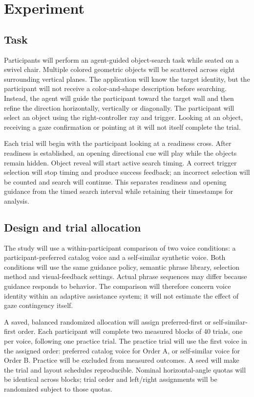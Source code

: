 \documentclass[11pt,letterpaper]{article}
\begin{document}
\setcounter{section}{3}
\section{Experiment}
\subsection{Task}
Participants will perform an agent-guided object-search task while seated on a swivel chair. Multiple colored geometric objects will be scattered across eight surrounding vertical planes. The application will know the target identity, but the participant will not receive a color-and-shape description before searching. Instead, the agent will guide the participant toward the target wall and then refine the direction horizontally, vertically or diagonally. The participant will select an object using the right-controller ray and trigger. Looking at an object, receiving a gaze confirmation or pointing at it will not itself complete the trial.

Each trial will begin with the participant looking at a readiness cross. After readiness is established, an opening directional cue will play while the objects remain hidden. Object reveal will start active search timing. A correct trigger selection will stop timing and produce success feedback; an incorrect selection will be counted and search will continue. This separates readiness and opening guidance from the timed search interval while retaining their timestamps for analysis.

\subsection{Design and trial allocation}
The study will use a within-participant comparison of two voice conditions: a participant-preferred catalog voice and a self-similar synthetic voice. Both conditions will use the same guidance policy, semantic phrase library, selection method and visual-feedback settings. Actual phrase sequences may differ because guidance responds to behavior. The comparison will therefore concern voice identity within an adaptive assistance system; it will not estimate the effect of gaze contingency itself.

A saved, balanced randomized allocation will assign preferred-first or self-similar-first order. Each participant will complete two measured blocks of 40 trials, one per voice, following one practice trial. The practice trial will use the first voice in the assigned order: preferred catalog voice for Order A, or self-similar voice for Order B. Practice will be excluded from measured outcomes. A seed will make the trial and layout schedules reproducible. Nominal horizontal-angle quotas will be identical across blocks; trial order and left/right assignments will be randomized subject to those quotas.
\end{document}
